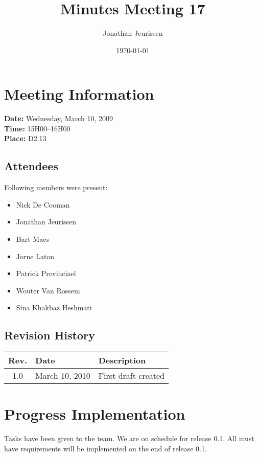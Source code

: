 \documentclass[a4paper, 12pt]{article}
\begin{document}
\title{Minutes Meeting 17}
\author{Jonathan Jeurissen}
\date{\today}

\maketitle	
	\section{Meeting Information}
		\textbf{Date:} Wednesday, March 10, 2009\\
		\textbf{Time:} 15H00--16H00\\
		\textbf{Place:} D2.13\\
		\subsection{Attendees}
Following members were present:
			\begin{itemize}
				\item Nick De Cooman
				\item Jonathan Jeurissen
				\item Bart Maes
				\item Jorne Laton
				\item Patrick Provinciael
				\item Wouter Van Rossem
				\item Sina Khakbaz Heshmati
			\end{itemize}
			 
			
		\subsection{Revision History}
			\begin{tabular}{c | l | l }
				\textbf{Rev.} & \textbf{Date} & \textbf{Description} \\
				\hline
				1.0 & March 10, 2010 & First draft created \\
			\end{tabular}		

	\section{Progress Implementation}
Tasks have been given to the team. We are on schedule for release 0.1. All must have requirements will be implemented on the end of release 0.1.
\end{document}
